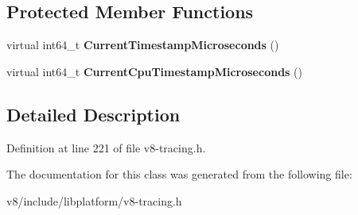 \subsection*{Protected Member Functions}
\begin{DoxyCompactItemize}
\item 
\mbox{\label{classv8_1_1platform_1_1tracing_1_1TracingController_aba5668b2163752b7db26e7bfbf6da126}} 
virtual int64\+\_\+t {\bfseries Current\+Timestamp\+Microseconds} ()
\item 
\mbox{\label{classv8_1_1platform_1_1tracing_1_1TracingController_a9c62551015b9dae53ab0c9817946ed48}} 
virtual int64\+\_\+t {\bfseries Current\+Cpu\+Timestamp\+Microseconds} ()
\end{DoxyCompactItemize}


\subsection{Detailed Description}


Definition at line 221 of file v8-\/tracing.\+h.



The documentation for this class was generated from the following file\+:\begin{DoxyCompactItemize}
\item 
v8/include/libplatform/v8-\/tracing.\+h\end{DoxyCompactItemize}
